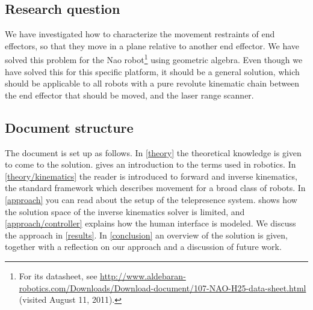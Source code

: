 \subsection{Research question}
We have investigated how to characterize the movement restraints of end effectors, so that they move in a plane relative to another end effector.  We have solved this problem for the Nao robot\footnote{For its datasheet, see \url{http://www.aldebaran-robotics.com/Downloads/Download-document/107-NAO-H25-data-sheet.html} (visited August 11, 2011).} using geometric algebra.  Even though we have solved this for this specific platform, it should be a general solution, which should be applicable to all robots with a pure revolute kinematic chain between the end effector that should be moved, and the laser range scanner.


\subsection{Document structure}
The document is set up as follows. In \cref{theory} the theoretical knowledge is given to come to the solution.  gives an introduction to the terms used in robotics.  In \cref{theory/kinematics} the reader is introduced to forward and inverse kinematics, the standard framework which describes movement for a broad class of robots.  In \cref{approach} you can read about the setup of the telepresence system.   shows how the solution space of the inverse kinematics solver is limited, and \cref{approach/controller} explains how the human interface is modeled. We discuss the approach in \cref{results}.  In \cref{conclusion} an overview of the solution is given, together with a reflection on our approach and a discussion of future work.

